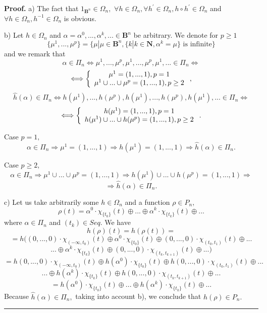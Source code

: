 \documentclass[12pt]{article}\usepackage{amsmath}
\newenvironment{proof}[1][Proof]{\textbf{#1.} }{\ \rule{0.5em}{0.5em}}
\begin{document}
\begin{proof}
a) The fact that $1_{\mathbf{B}^{n}}\in\Omega_{n},$ $\forall h\in\Omega
_{n},\forall h^{\prime}\in\Omega_{n},h\circ h^{\prime}\in\Omega_{n}$ and
$\forall h\in\Omega_{n},h^{-1}\in\Omega_{n}$ is obvious.

b) Let $h\in\Omega_{n}$ and $\alpha=\alpha^{0},...,\alpha^{k},...\in
\mathbf{B}^{n}$ be arbitrary. We denote for $p\geq1$\[
\{\mu^{1},...,\mu^{p}\}=\{\mu|\mu\in\mathbf{B}^{n},\{k|k\in\mathbf{N},\alpha^{k}=\mu\}\text{ is infinite}\}
\]
and we remark that\[
\alpha\in\Pi_{n}\Longleftrightarrow\mu^{1},...,\mu^{p},\mu^{1},...,\mu^{p},\mu^{1},...\in\Pi_{n}\Longleftrightarrow
\]\[
\Longleftrightarrow\left\{
\begin{array}
[c]{c}\mu^{1}=(1,...,1),p=1\\
\mu^{1}\cup...\cup\mu^{p}=(1,...,1),p\geq2
\end{array}
\right.  ,
\]\[
\widehat{h}(\alpha)\in\Pi_{n}\Longleftrightarrow h(\mu^{1}),...,h(\mu
^{p}),h(\mu^{1}),...,h(\mu^{p}),h(\mu^{1}),...\in\Pi_{n}\Longleftrightarrow
\]\[
\Longleftrightarrow\left\{
\begin{array}
[c]{c}h(\mu^{1})=(1,...,1),p=1\\
h(\mu^{1})\cup...\cup h(\mu^{p})=(1,...,1),p\geq2
\end{array}
\right.  .
\]


Case $p=1,$\[
\alpha\in\Pi_{n}\Longrightarrow\mu^{1}=(1,...,1)\Longrightarrow h(\mu
^{1})=(1,...,1)\Longrightarrow\widehat{h}(\alpha)\in\Pi_{n}.
\]


Case $p\geq2,$\[
\alpha\in\Pi_{n}\Longrightarrow\mu^{1}\cup...\cup\mu^{p}=(1,...,1)\Longrightarrow h(\mu^{1})\cup...\cup h(\mu^{p})=(1,...,1)\Longrightarrow
\]\[
\Longrightarrow\widehat{h}(\alpha)\in\Pi_{n}.
\]


c) Let us take arbitrarily some $h\in\Omega_{n}$ and a function $\rho\in
P_{n},$\[
\rho(t)=\alpha^{0}\cdot\chi_{\{t_{0}\}}(t)\oplus...\oplus\alpha^{k}\cdot
\chi_{\{t_{k}\}}(t)\oplus...
\]
where $\alpha\in\Pi_{n}$ and $(t_{k})\in Seq.$ We have\[
h(\rho)(t)=h(\rho(t))=
\]\[
=h((0,...,0)\cdot\chi_{(-\infty,t_{0})}(t)\oplus\alpha^{0}\cdot\chi
_{\{t_{0}\}}(t)\oplus(0,...,0)\cdot\chi_{(t_{0},t_{1})}(t)\oplus...
\]\[
...\oplus\alpha^{k}\cdot\chi_{\{t_{k}\}}(t)\oplus(0,...,0)\cdot\chi
_{(t_{k},t_{k+1})}(t)\oplus...)
\]\[
=h(0,...,0)\cdot\chi_{(-\infty,t_{0})}(t)\oplus h(\alpha^{0})\cdot
\chi_{\{t_{0}\}}(t)\oplus h(0,...,0)\cdot\chi_{(t_{0},t_{1})}(t)\oplus...
\]\[
...\oplus h(\alpha^{k})\cdot\chi_{\{t_{k}\}}(t)\oplus h(0,...,0)\cdot
\chi_{(t_{k},t_{k+1})}(t)\oplus...
\]\[
=h(\alpha^{0})\cdot\chi_{\{t_{0}\}}(t)\oplus...\oplus h(\alpha^{k})\cdot
\chi_{\{t_{k}\}}(t)\oplus...
\]
Because $\widehat{h}(\alpha)\in\Pi_{n},$ taking into account b), we conclude
that $h(\rho)\in P_{n}.$
\end{proof}
\end{document}

